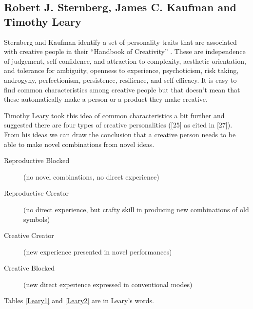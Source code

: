 \subsection{Robert J. Sternberg, James C. Kaufman and Timothy Leary}

Sternberg and Kaufman identify a set of personality traits that are associated with creative people in their ``Handbook of Creativity'' \citep{Sternberg1999, Sternberg1999}. These are independence of judgement, self-confidence, and attraction to complexity, aesthetic orientation, and tolerance for ambiguity, openness to experience, psychoticism, risk taking, androgyny, perfectionism, persistence, resilience, and self-efficacy. It is easy to find common characteristics among creative people but that doesn't mean that these automatically make a person or a product they make creative.

Timothy Leary took this idea of common characteristics a bit further and suggested there are four types of creative personalities ([25] as cited in [27]). From his ideas we can draw the conclusion that a creative person needs to be able to make novel combinations from novel ideas.

\begin{description}
  \item [Reproductive Blocked] (no novel combinations, no direct experience)
  \item [Reproductive Creator] (no direct experience, but crafty skill in producing new combinations of old symbols)
  \item [Creative Creator] (new experience presented in novel performances)
  \item [Creative Blocked] (new direct experience expressed in conventional modes)
\end{description}

Tables \ref{Leary1} and \ref{Leary2} are in Leary's words.

